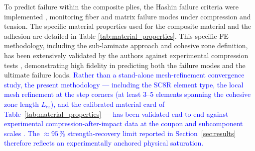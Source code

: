 \documentclass[
  preprint,
  12pt,
  a4paper
]{elsarticle}
\newcommand{\new}[1]{\textcolor{blue}{#1}}
\begin{document}
To predict failure within the composite plies, the Hashin failure criteria were implemented \cite{hashin1980failure}, monitoring fiber and matrix failure modes under compression and tension. The specific material properties used for the composite material and the adhesion are detailed in Table \ref{tab:material_properties}. This specific FE methodology, including the sub-laminate approach and cohesive zone definition, has been extensively validated by the authors against experimental compression tests \cite{psarras2020evaluating, psarras2023evaluating}, demonstrating high fidelity in predicting both the failure modes and the ultimate failure loads. \new{Rather than a stand-alone mesh-refinement convergence study, the present methodology --- including the SC8R element type, the local mesh refinement at the step corners (at least 3--5 elements spanning the cohesive zone length $L_{cz}$), and the calibrated material card of Table~\ref{tab:material_properties} --- has been validated end-to-end against experimental compression-after-impact data at the coupon and subcomponent scales \cite{psarras2024design, psarras2020evaluating, psarras2023evaluating}. The $\approx 95\,\%$ strength-recovery limit reported in Section~\ref{sec:results} therefore reflects an experimentally anchored physical saturation.}
\end{document}
